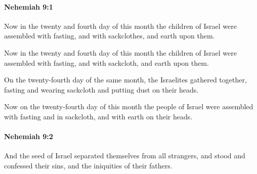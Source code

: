 		\paragraph{Nehemiah 9:1} %
			\label{NEHEMIAH-9-1}

			Now in the twenty and fourth day of this month the children of Israel were assembled with fasting, and with sackclothes, and earth upon them.

			\begin{versebox}
					\item[BHS] 
					\item[LXX] 
					\item[ASV] Now in the twenty and fourth day of this month the children of Israel were assembled with fasting, and with sackcloth, and earth upon them.
					\item[NIV] On the twenty-fourth day of the same month, the Israelites gathered together, fasting and wearing sackcloth and putting dust on their heads.
					\item[NRSV] Now on the twenty-fourth day of this month the people of Israel were assembled with fasting and in sackcloth, and with earth on their heads.
			\end{versebox}

		\paragraph{Nehemiah 9:2} %
			\label{NEHEMIAH-9-2}

			And the seed of Israel separated themselves from all strangers, and stood and confessed their sins, and the iniquities of their fathers.

